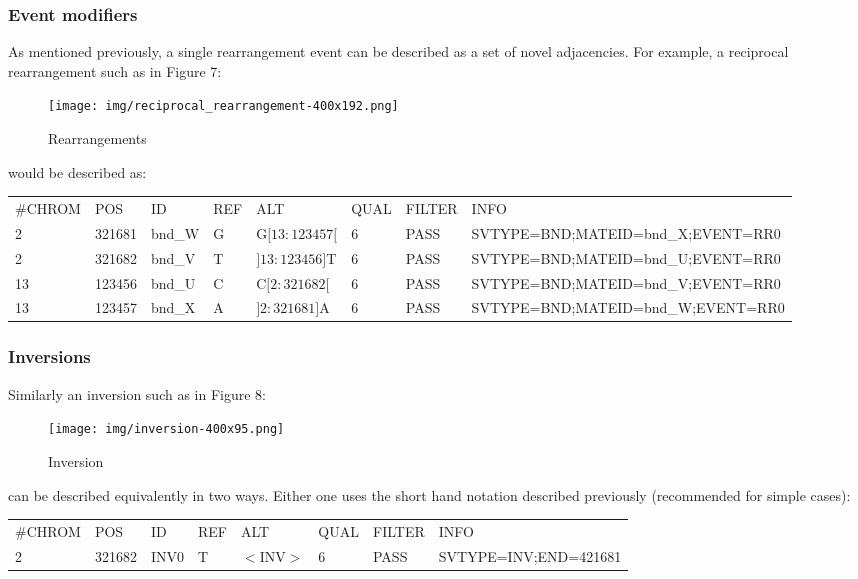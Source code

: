 \documentclass[8pt]{article}
\begin{document}
\subsubsection{Event modifiers}
As mentioned previously, a single rearrangement event can be described as a set of novel adjacencies.
For example, a reciprocal rearrangement such as in Figure 7:

\begin{figure}[ht]
\centering
\texttt{[image: img/reciprocal\_rearrangement-400x192.png]}
\caption{Rearrangements}
\end{figure}

\noindent
would be described as:

\vspace{0.3cm}
\footnotesize
\begin{tabular}{ l l l l l l l l }
\#CHROM & POS & ID & REF & ALT & QUAL & FILTER & INFO \\
2 & 321681 & bnd\_W & G & G$[13:123457[$ & 6 & PASS & SVTYPE=BND;MATEID=bnd\_X;EVENT=RR0 \\
2 & 321682 & bnd\_V & T & $]13:123456]$T & 6 & PASS & SVTYPE=BND;MATEID=bnd\_U;EVENT=RR0 \\
13 & 123456 & bnd\_U & C & C$[2:321682[$ & 6 & PASS & SVTYPE=BND;MATEID=bnd\_V;EVENT=RR0 \\
13 & 123457 & bnd\_X & A & $]2:321681]$A & 6 & PASS & SVTYPE=BND;MATEID=bnd\_W;EVENT=RR0 \\
\end{tabular}
\normalsize

\subsubsection{Inversions}
\begin{samepage}
Similarly an inversion such as in Figure 8:

\begin{figure}[ht]
\centering
\texttt{[image: img/inversion-400x95.png]}
\caption{Inversion}
\end{figure}

\noindent
can be described equivalently in two ways.
Either one uses the short hand notation described previously (recommended for simple cases):
\end{samepage}

\vspace{0.3cm}
\small
\begin{tabular}{ l l l l l l l l }
\#CHROM & POS & ID & REF & ALT & QUAL & FILTER & INFO \\
2 & 321682 & INV0 & T & $<$INV$>$ & 6 & PASS & SVTYPE=INV;END=421681 \\
\end{tabular}
\normalsize
\vspace{0.3cm}
\end{document}
